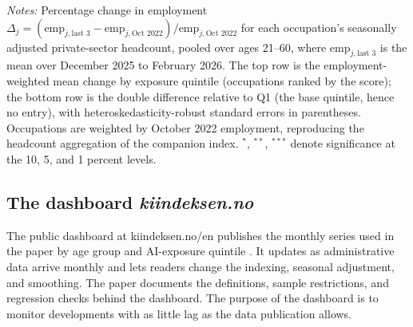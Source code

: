 \documentclass[12pt]{article}
\begin{document}
\begin{table}[tp]
  \centering
  \caption{Employment change by AI-exposure quintile: all ages 21--60, private sector.}
  \label{tab:quintile_yagan}
  
  \begin{minipage}{\textwidth}\footnotesize\textit{Notes:} Percentage change in employment $\Delta_j = (\text{emp}_{j,\text{last 3}}-\text{emp}_{j,\text{Oct }2022})/\text{emp}_{j,\text{Oct }2022}$ for each occupation's seasonally adjusted private-sector headcount, pooled over ages 21--60, where $\text{emp}_{j,\text{last 3}}$ is the mean over December 2025 to February 2026. The top row is the employment-weighted mean change by exposure quintile (occupations ranked by the \citet{eloundou2024} score); the bottom row is the double difference relative to Q1 (the base quintile, hence no entry), with heteroskedasticity-robust standard errors in parentheses. Occupations are weighted by October 2022 employment, reproducing the headcount aggregation of the companion index. $^{*}$, $^{**}$, $^{***}$ denote significance at the 10, 5, and 1 percent levels.\end{minipage}
\end{table}

\subsection{The dashboard \emph{kiindeksen.no}}\label{sec:tracking:kiindeksen}

The public dashboard at kiindeksen.no/en publishes the monthly series used in the paper by age group and AI-exposure quintile \citep{kiindeksen2026}. It updates as administrative data arrive monthly and lets readers change the indexing, seasonal adjustment, and smoothing. The paper documents the definitions, sample restrictions, and regression checks behind the dashboard. The purpose of the dashboard is to monitor developments with as little lag as the data publication allows.
\end{document}

